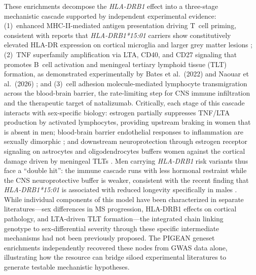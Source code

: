 These enrichments decompose the \textit{HLA-DRB1} effect into a three-stage mechanistic cascade supported by independent experimental evidence: (1)~enhanced MHC-II-mediated antigen presentation driving T~cell priming, consistent with reports that \textit{HLA-DRB1*15:01} carriers show constitutively elevated HLA-DR expression on cortical microglia and larger grey matter lesions \cite{enz_increased_2020, yates_association_2015}; (2)~TNF superfamily amplification via LTA, CD40, and CD27 signaling that promotes B~cell activation and meningeal tertiary lymphoid tissue (TLT) formation, as demonstrated experimentally by Bates et al.\ (2022) and Naouar et al.\ (2026) \cite{bates_lymphotoxin_2022, naouar_lymphotoxin_2026}; and (3)~cell adhesion molecule-mediated lymphocyte transmigration across the blood-brain barrier, the rate-limiting step for CNS immune infiltration and the therapeutic target of natalizumab. Critically, each stage of this cascade interacts with sex-specific biology: estrogen partially suppresses TNF/LTA production by activated lymphocytes, providing upstream braking in women that is absent in men; blood-brain barrier endothelial responses to inflammation are sexually dimorphic \cite{weber_cerebrovascular_2021}; and downstream neuroprotection through estrogen receptor signaling on astrocytes and oligodendrocytes buffers women against the cortical damage driven by meningeal TLTs \cite{spence_neuroprotection_2011}. Men carrying \textit{HLA-DRB1} risk variants thus face a ``double hit'': the immune cascade runs with less hormonal restraint while the CNS neuroprotective buffer is weaker, consistent with the recent finding that \textit{HLA-DRB1*15:01} is associated with reduced longevity specifically in males \cite{mendoza_mejia_hla_2025}. While individual components of this model have been characterized in separate literatures---sex differences in MS progression, HLA-DRB1 effects on cortical pathology, and LTA-driven TLT formation---the integrated chain linking genotype to sex-differential severity through these specific intermediate mechanisms had not been previously proposed. The PIGEAN geneset enrichments independently recovered these nodes from GWAS data alone, illustrating how the resource can bridge siloed experimental literatures to generate testable mechanistic hypotheses.


